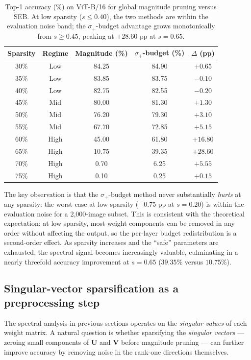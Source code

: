 \documentclass[11pt]{article}
\theoremstyle{plain}
\theoremstyle{definition}
\theoremstyle{remark}
\newcommand{\1}{\mathbf{1}}
\begin{document}
\begin{table}[ht]
\centering
\caption{Top-1 accuracy (\%) on ViT-B/16 for global magnitude pruning versus SEB.  At low sparsity (\(s\le 0.40\)), the two methods are within the evaluation noise band; the \(\sigma_+\)-budget advantage grows monotonically from \(s\ge 0.45\), peaking at \(+28.60\) pp at \(s=0.65\).}
\label{tab:final_comparison}
\begin{tabular}{ccccc}
\toprule
Sparsity & Regime & Magnitude (\%) & \(\sigma_+\)-budget (\%) & \(\Delta\) (pp) \\
\midrule
30\% & Low & 84.25 & 84.90 & \(+0.65\) \\
35\% & Low & 83.85 & 83.75 & \(-0.10\) \\
40\% & Low & 82.75 & 82.55 & \(-0.20\) \\
\midrule
45\% & Mid & 80.00 & 81.30 & \(+1.30\) \\
50\% & Mid & 76.20 & 79.30 & \(+3.10\) \\
55\% & Mid & 67.70 & 72.85 & \(+5.15\) \\
\midrule
60\% & High & 45.00 & 61.80 & \(+16.80\) \\
65\% & High & 10.75 & 39.35 & \(+28.60\) \\
70\% & High & 0.70 & 6.25 & \(+5.55\) \\
75\% & High & 0.10 & 0.25 & \(+0.15\) \\
\bottomrule
\end{tabular}
\end{table}

The key observation is that the \(\sigma_+\)-budget method never substantially \emph{hurts} at any sparsity: the worst-case at low sparsity (\(-0.75\) pp at \(s=0.20\)) is within the evaluation noise for a 2{,}000-image subset.  This is consistent with the theoretical expectation: at low sparsity, most weight components can be removed in any order without affecting the output, so the per-layer budget redistribution is a second-order effect.  As sparsity increases and the ``safe'' parameters are exhausted, the spectral signal becomes increasingly valuable, culminating in a nearly threefold accuracy improvement at \(s=0.65\) (\(39.35\%\) versus \(10.75\%\)).

\subsection{Singular-vector sparsification as a preprocessing step}
\label{subsec:sv_preprocessing}

The spectral analysis in previous sections operates on the \emph{singular values} of each weight matrix.  A natural question is whether sparsifying the \emph{singular vectors} --- zeroing small components of \(\mathbf{U}\) and \(\mathbf{V}\) before magnitude pruning --- can further improve accuracy by removing noise in the rank-one directions themselves.
\end{document}
